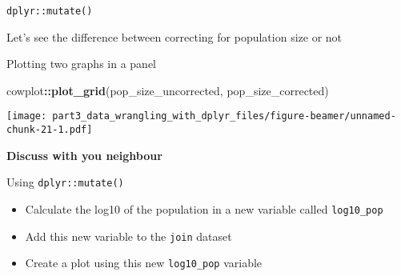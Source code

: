 \documentclass[ignorenonframetext,]{beamer}
\newenvironment{Shaded}{\begin{snugshade}}{\end{snugshade}}
\newcommand{\DataTypeTok}[1]{\textcolor[rgb]{0.13,0.29,0.53}{#1}}
\newcommand{\DecValTok}[1]{\textcolor[rgb]{0.00,0.00,0.81}{#1}}
\newcommand{\KeywordTok}[1]{\textcolor[rgb]{0.13,0.29,0.53}{\textbf{#1}}}
\newcommand{\NormalTok}[1]{#1}
\newcommand{\OperatorTok}[1]{\textcolor[rgb]{0.81,0.36,0.00}{\textbf{#1}}}
\newcommand{\StringTok}[1]{\textcolor[rgb]{0.31,0.60,0.02}{#1}}
\providecommand{\tightlist}{%
  \setlength{\itemsep}{0pt}\setlength{\parskip}{0pt}}
\begin{document}
\begin{frame}[fragile]{\texttt{dplyr::mutate()}}
\begin{block}{Let's see the difference between correcting for population
size or not}
\begin{Shaded}
\end{Shaded}

\end{block}

\begin{block}{Plotting two graphs in a panel}

\begin{Shaded}
\begin{Highlighting}[]
\NormalTok{cowplot}\OperatorTok{::}\KeywordTok{plot_grid}\NormalTok{(pop_size_uncorrected,}
\NormalTok{                   pop_size_corrected)}
\end{Highlighting}
\end{Shaded}

\texttt{[image: part3\_data\_wrangling\_with\_dplyr\_files/figure-beamer/unnamed-chunk-21-1.pdf]}

\end{block}

\begin{block}{\textbf{Discuss with you neighbour}}

Using \texttt{dplyr::mutate()}

\begin{itemize}
\tightlist
\item
  Calculate the log10 of the population in a new variable called
  \texttt{log10\_pop}
\item
  Add this new variable to the \texttt{join} dataset\\
\item
  Create a plot using this new \texttt{log10\_pop} variable
\end{itemize}


\end{block}
\end{frame}
\end{document}
